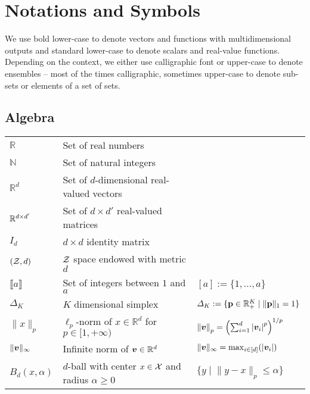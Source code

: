 \chapter*{Notations and Symbols}

We use bold lower-case to denote vectors and functions with multidimensional outputs and standard lower-case to denote scalars and real-value functions. Depending on the context, we either use calligraphic font or upper-case to denote ensembles -- most of the times calligraphic, sometimes upper-case to denote sub-sets or elements of a set of sets. 

\section*{Algebra}
\begin{tabular}{lll} %
$\mathbb{R}$  & Set of real numbers & \\
$\mathbb{N}$ & Set of natural integers & \\
$\mathbb{R}^d$ & Set of $d$-dimensional real-valued vectors & \\
$\mathbb{R}^{d \times d'}$ & Set of $d \times d'$ real-valued matrices \\
$I_d$ & $d \times d$ identity matrix \\
$(\mathcal{Z},d)$ & $\mathcal{Z}$ space endowed with metric $d$\\
$\llbracket a\rrbracket $ & Set of integers between $1$ and $a$ & $[a] := \{1, \ldots, a \}$ \\
$\Delta_K$ & $K$ dimensional simplex & $\Delta_K := \{ \mathbf{p} \in \mathbb{R}^K_+\mid \lVert\mathbf{p}\rVert_1 =1 \}$ \\
$\| x \|_{p}$ & $\ell_p$-norm of $x \in \mathbb{R}^d$ for $p \in [1,+\infty)$ & $ \norm{\vectorsym{v}}_p = \left(\sum_{i = 1}^d \abs{\vectorsym{v}_i}^p \right)^{1/p}$ \\
$\| \vectorsym{v} \|_{\infty}$ & Infinite norm of $\vectorsym{v} \in \mathbb{R}^d$ & $\| \vectorsym{v} \|_{\infty} = \max_{i \in [d]} ( |\vectorsym{v}_i|) $ \\ 
$B_d(x,\alpha)$  & $d$-ball with center $x \in \mathcal{X}$ and radius $\alpha \geq 0$ & $\{y \mid \lVert y-x\rVert_p \leq \alpha \}$ \\

\end{tabular}
